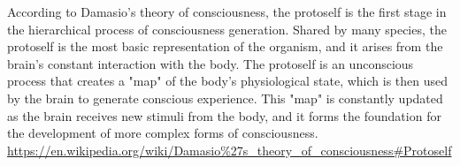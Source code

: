 \documentclass[a4paper]{article}
\title{}
\date{}
\begin{document}
    \maketitle
    According to Damasio's theory of consciousness, the protoself is the first stage in the hierarchical process of consciousness generation. Shared by many species, the protoself is the most basic representation of the organism, and it arises from the brain's constant interaction with the body. The protoself is an unconscious process that creates a "map" of the body's physiological state, which is then used by the brain to generate conscious experience. This "map" is constantly updated as the brain receives new stimuli from the body, and it forms the foundation for the development of more complex forms of consciousness.
    \url{https://en.wikipedia.org/wiki/Damasio%27s_theory_of_consciousness#Protoself}
    
\end{document}
